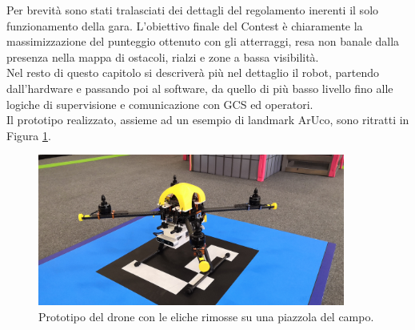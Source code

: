 Per brevità sono stati tralasciati dei dettagli del regolamento inerenti il solo funzionamento della gara. L'obiettivo finale del Contest è chiaramente la massimizzazione del punteggio ottenuto con gli atterraggi, resa non banale dalla presenza nella mappa di ostacoli, rialzi e zone a bassa visibilità.\\
Nel resto di questo capitolo si descriverà più nel dettaglio il robot, partendo dall'hardware e passando poi al software, da quello di più basso livello fino alle logiche di supervisione e comunicazione con GCS ed operatori.\\
Il prototipo realizzato, assieme ad un esempio di landmark ArUco, sono ritratti in Figura \ref{fig:drone}.

\begin{figure}
    \centering
    \includegraphics[width=0.9\textwidth]{figs/chapter3/drone_aruco.jpg}
    \caption{Prototipo del drone con le eliche rimosse su una piazzola del campo.}
    \label{fig:drone}
\end{figure}
\clearpage

